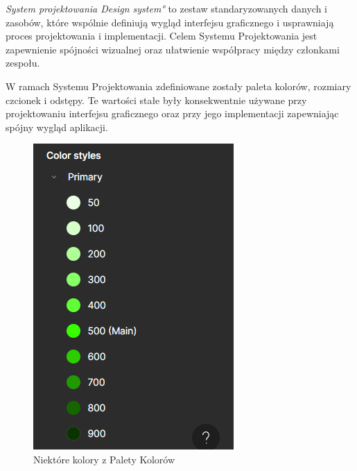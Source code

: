 \emph{System projektowania \ang{Design system}} to zestaw standaryzowanych danych i zasobów, które wspólnie definiują wygląd interfejsu graficznego i usprawniają proces projektowania i implementacji. Celem Systemu Projektowania jest zapewnienie spójności wizualnej oraz ułatwienie współpracy między członkami zespołu.
\par
W ramach Systemu Projektowania zdefiniowane zostały paleta kolorów, rozmiary czcionek i odstępy. Te wartości stałe były konsekwentnie używane przy projektowaniu interfejsu graficznego oraz przy jego implementacji zapewniając spójny wygląd aplikacji.
\begin{figure}[!ht]
    \centering
    \includegraphics[width=0.3\linewidth]{Images/figma_system_projektowania_1.png}
    \caption{Niektóre kolory z Palety Kolorów}
    \label{fig:enter-label}
\end{figure}


